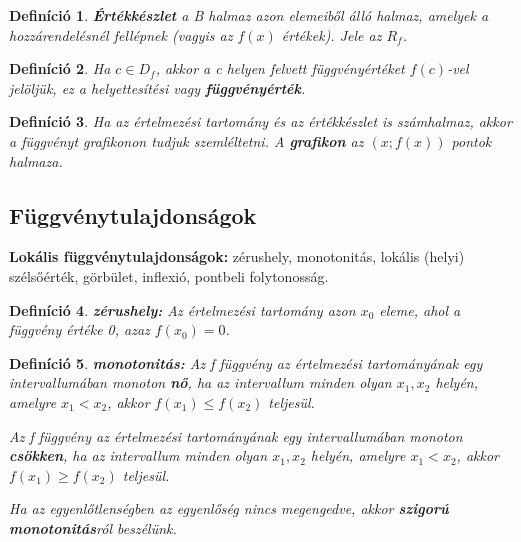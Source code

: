 \documentclass[12pt,a4paper]{article}
\newtheorem{definition}{Definíció} [section]
\begin{document}
\begin{definition}
\textbf{Értékkészlet} a B halmaz azon elemeiből álló halmaz, amelyek a hozzárendelésnél fellépnek (vagyis az $f(x)$ értékek). Jele az $R_f$.
\end{definition}

\begin{definition}
Ha $c \in D_f$, akkor a c helyen felvett függvényértéket $f(c)$-vel jelöljük, ez a helyettesítési vagy \textbf{függvényérték}.
\end{definition}

\begin{definition}
Ha az értelmezési tartomány és az értékkészlet is számhalmaz, akkor a függvényt grafikonon tudjuk szemléltetni. A \textbf{grafikon} az $(x; f(x))$ pontok halmaza.
\end{definition}

\subsection{Függvénytulajdonságok}

\textbf{Lokális függvénytulajdonságok:} zérushely, monotonitás, lokális (helyi) szélsőérték, görbület,
inflexió, pontbeli folytonosság.

\begin{definition}
\textbf{zérushely:} Az értelmezési tartomány azon $x_0$ eleme, ahol a függvény értéke 0, azaz $f(x_0) = 0$.
\end{definition}

\begin{definition}
\textbf{monotonitás:} Az f függvény az értelmezési tartományának egy intervallumában monoton \textbf{nő}, ha az intervallum minden olyan $x_1, x_2$ helyén, amelyre $x_1 < x_2$, akkor $f(x_1) \leq f(x_2)$ teljesül.

Az f függvény az értelmezési tartományának egy intervallumában monoton \textbf{csökken}, ha az intervallum minden olyan $x_1, x_2$ helyén, amelyre $x_1 < x_2$, akkor $f(x_1) \geq f(x_2)$ teljesül.

Ha az egyenlőtlenségben az egyenlőség nincs megengedve, akkor \textbf{szigorú monotonitás}ról beszélünk.
\end{definition}
\end{document}

